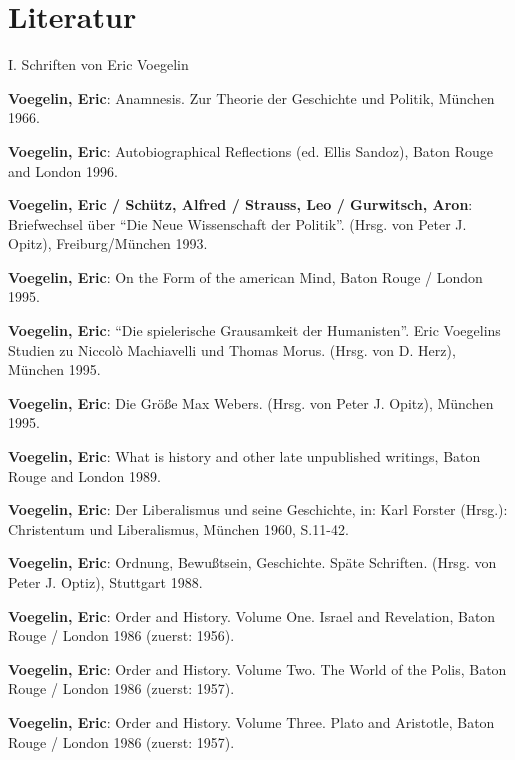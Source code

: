  

\newpage

\chapter{Literatur}

\setlength{\parindent}{0ex}


\setlength{\parskip}{5ex}

{\large I. Schriften von Eric Voegelin}

\setlength{\parskip}{3ex}

{\bf Voegelin, Eric}: Anamnesis. Zur Theorie der Geschichte und Politik,
München 1966.  %

\setlength{\parskip}{1.5ex}

{\bf Voegelin, Eric}: Autobiographical Reflections (ed. Ellis Sandoz), Baton
Rouge and London 1996.

{\bf Voegelin, Eric / Schütz, Alfred / Strauss, Leo / Gurwitsch, Aron}:
Briefwechsel über "`Die Neue Wissenschaft der Politik"'. (Hrsg. von Peter
J. Opitz), Freiburg/München 1993.  %

{\bf Voegelin, Eric}: On the Form of the american Mind, Baton Rouge / London
1995.

{\bf Voegelin, Eric}: "`Die spielerische Grausamkeit der Humanisten"'. Eric
Voegelins Studien zu Niccolò Machiavelli und Thomas Morus. (Hrsg. von
D. Herz), München 1995.

{\bf Voegelin, Eric}: Die Größe Max Webers. (Hrsg. von Peter J. Opitz),
München 1995.  %

{\bf Voegelin, Eric}: What is history and other late unpublished writings,
Baton Rouge and London 1989.

{\bf Voegelin, Eric}: Der Liberalismus und seine Geschichte, in: Karl Forster
(Hrsg.): Christentum und Liberalismus, München 1960, S.11-42.

{\bf Voegelin, Eric}: Ordnung, Bewußtsein, Geschichte. Späte Schriften.
(Hrsg. von Peter J. Optiz), Stuttgart 1988.

{\bf Voegelin, Eric}: Order and History. Volume One. Israel and Revelation,
Baton Rouge / London 1986 (zuerst: 1956).

{\bf Voegelin, Eric}: Order and History. Volume Two. The World of the Polis,
Baton Rouge / London 1986 (zuerst: 1957).

{\bf Voegelin, Eric}: Order and History. Volume Three. Plato and Aristotle,
Baton Rouge / London 1986 (zuerst: 1957).

